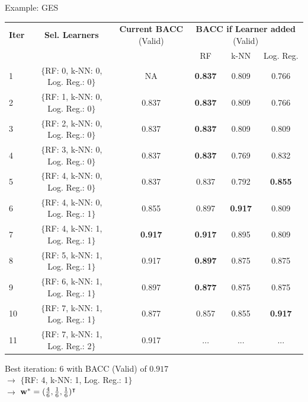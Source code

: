\documentclass[10pt,compress,t,notes=noshow, xcolor=table]{beamer}
\begin{document}

\begin{vbframe}{Example: GES}
\begin{table}[h]
\footnotesize
\centering
\begin{tabular}{lccccc}
\hline
\textbf{Iter} & \textbf{Sel. Learners} & \textbf{Current BACC} (Valid) & \multicolumn{3}{c}{\textbf{BACC if Learner added} (Valid)}\\ \cline{4-6}
& & & RF & k-NN & Log. Reg.\\ \hline
1  & $\{$RF: 0, k-NN: 0, Log. Reg.: 0$\}$ & NA    & \textbf{0.837} & 0.809 & 0.766\\
2  & $\{$RF: 1, k-NN: 0, Log. Reg.: 0$\}$ & 0.837 & \textbf{0.837} & 0.809 & 0.766\\
3  & $\{$RF: 2, k-NN: 0, Log. Reg.: 0$\}$ & 0.837 & \textbf{0.837} & 0.809 & 0.809\\
4  & $\{$RF: 3, k-NN: 0, Log. Reg.: 0$\}$ & 0.837 & \textbf{0.837} & 0.769 & 0.832\\
5  & $\{$RF: 4, k-NN: 0, Log. Reg.: 0$\}$ & 0.837 & 0.837 & 0.792 & \textbf{0.855}\\
6  & $\{$RF: 4, k-NN: 0, Log. Reg.: 1$\}$ & 0.855 & 0.897 & \textbf{0.917} & 0.809\\
7  & $\{$RF: 4, k-NN: 1, Log. Reg.: 1$\}$ & \textbf{0.917} & \textbf{0.917} & 0.895 & 0.809\\
8  & $\{$RF: 5, k-NN: 1, Log. Reg.: 1$\}$ & 0.917 & \textbf{0.897} & 0.875 & 0.875\\
9  & $\{$RF: 6, k-NN: 1, Log. Reg.: 1$\}$ & 0.897 & \textbf{0.877} & 0.875 & 0.875\\
10 & $\{$RF: 7, k-NN: 1, Log. Reg.: 1$\}$ & 0.877 & 0.857 & 0.855 & \textbf{0.917}\\
11 & $\{$RF: 7, k-NN: 1, Log. Reg.: 2$\}$ & 0.917 & ... & ... & ...\\
\hline
\end{tabular}
\label{table:learners_valid_test}
\end{table}
Best iteration: 6 with BACC (Valid) of $0.917$\\
$\rightarrow$ $\{$RF: 4, k-NN: 1, Log. Reg.: 1$\}$\\
$\rightarrow$ $\mathbf{w}^{*} = (\frac{4}{6}, \frac{1}{6}, \frac{1}{6})^\intercal$
\end{vbframe}

\end{document}
